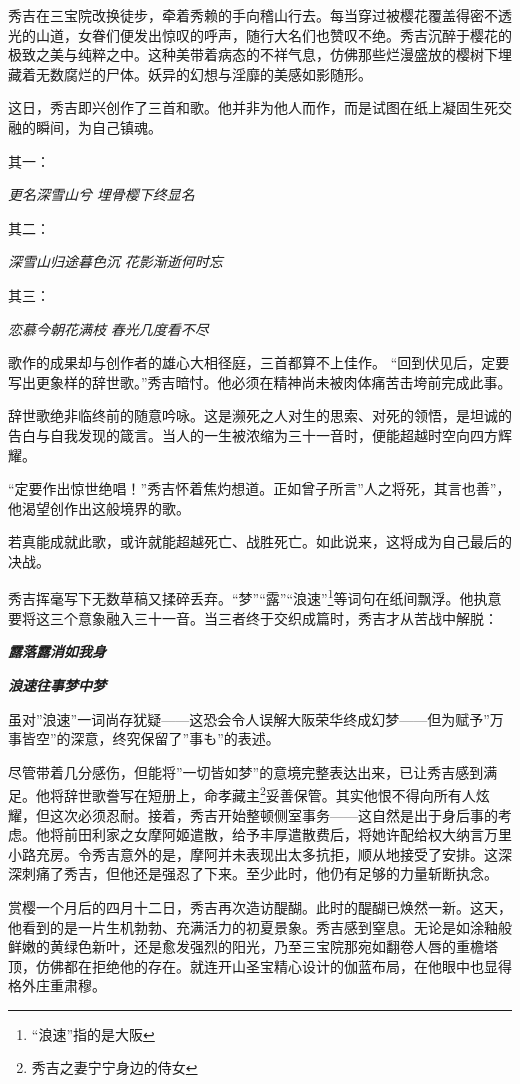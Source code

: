 \documentclass[
]{book}
\begin{document}
秀吉在三宝院改换徒步，牵着秀赖的手向稽山行去。每当穿过被樱花覆盖得密不透光的山道，女眷们便发出惊叹的呼声，随行大名们也赞叹不绝。秀吉沉醉于樱花的极致之美与纯粹之中。这种美带着病态的不祥气息，仿佛那些烂漫盛放的樱树下埋藏着无数腐烂的尸体。妖异的幻想与淫靡的美感如影随形。

这日，秀吉即兴创作了三首和歌。他并非为他人而作，而是试图在纸上凝固生死交融的瞬间，为自己镇魂。

其一：

\emph{更名深雪山兮}
\emph{埋骨樱下终显名}

其二：

\emph{深雪山归途暮色沉}
\emph{花影渐逝何时忘}

其三：

\emph{恋慕今朝花满枝}
\emph{春光几度看不尽}

歌作的成果却与创作者的雄心大相径庭，三首都算不上佳作。
``回到伏见后，定要写出更象样的辞世歌。''秀吉暗忖。他必须在精神尚未被肉体痛苦击垮前完成此事。

辞世歌绝非临终前的随意吟咏。这是濒死之人对生的思索、对死的领悟，是坦诚的告白与自我发现的箴言。当人的一生被浓缩为三十一音时，便能超越时空向四方辉耀。

``定要作出惊世绝唱！''秀吉怀着焦灼想道。正如曾子所言''人之将死，其言也善''，他渴望创作出这般境界的歌。

若真能成就此歌，或许就能超越死亡、战胜死亡。如此说来，这将成为自己最后的决战。

秀吉挥毫写下无数草稿又揉碎丢弃。``梦''``露''``浪速''\footnote{``浪速''指的是大阪}等词句在纸间飘浮。他执意要将这三个意象融入三十一音。当三者终于交织成篇时，秀吉才从苦战中解脱：

\textbf{\emph{露落露消如我身}}

\textbf{\emph{浪速往事梦中梦}}

虽对''浪速''一词尚存犹疑------这恐会令人误解大阪荣华终成幻梦------但为赋予''万事皆空''的深意，终究保留了''事も''的表述。

尽管带着几分感伤，但能将''一切皆如梦''的意境完整表达出来，已让秀吉感到满足。他将辞世歌誊写在短册上，命孝藏主\footnote{秀吉之妻宁宁身边的侍女}妥善保管。其实他恨不得向所有人炫耀，但这次必须忍耐。接着，秀吉开始整顿侧室事务------这自然是出于身后事的考虑。他将前田利家之女摩阿姬遣散，给予丰厚遣散费后，将她许配给权大纳言万里小路充房。令秀吉意外的是，摩阿并未表现出太多抗拒，顺从地接受了安排。这深深刺痛了秀吉，但他还是强忍了下来。至少此时，他仍有足够的力量斩断执念。

赏樱一个月后的四月十二日，秀吉再次造访醍醐。此时的醍醐已焕然一新。这天，他看到的是一片生机勃勃、充满活力的初夏景象。秀吉感到窒息。无论是如涂釉般鲜嫩的黄绿色新叶，还是愈发强烈的阳光，乃至三宝院那宛如翻卷人唇的重檐塔顶，仿佛都在拒绝他的存在。就连开山圣宝精心设计的伽蓝布局，在他眼中也显得格外庄重肃穆。
\end{document}

